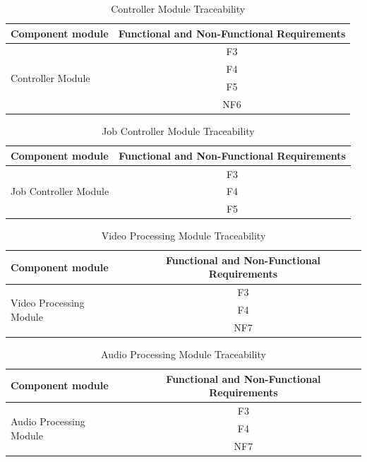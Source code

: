 \documentclass{article}
\begin{document}
\begin{table}[H]
    \caption{Controller Module Traceability}
    \centering
    \begin{tabular}{|l|c|} \hline
        \textbf{Component module} & \textbf{Functional and Non-Functional Requirements} \\ \hline
         \multirow{4}{*}{Controller Module} & F3 \\ \cline{2-2}
         & F4 \\ \cline{2-2}
         & F5 \\ \cline{2-2}
         & NF6 \\ \hline
    \end{tabular}
    \label{tab:Controller_Traceability}
\end{table}

\begin{table}[H]
    \caption{Job Controller Module Traceability}
    \centering
    \begin{tabular}{|l|c|} \hline
        \textbf{Component module} & \textbf{Functional and Non-Functional Requirements} \\ \hline
         \multirow{3}{*}{Job Controller Module} & F3 \\ \cline{2-2}
         & F4 \\ \cline{2-2}
         & F5 \\ \hline
    \end{tabular}
    \label{tab:Job_Controller_Traceability}
\end{table}

\begin{table}[H]
    \caption{Video Processing Module Traceability}
    \centering
    \begin{tabular}{|l|c|} \hline
        \textbf{Component module} & \textbf{Functional and Non-Functional Requirements} \\ \hline
         \multirow{3}{*}{Video Processing Module } & F3 \\ \cline{2-2}
         & F4 \\ \cline{2-2}
         & NF7 \\ \hline
    \end{tabular}
    \label{tab:Video_Processing_Module}
\end{table}

\begin{table}[H]
    \caption{Audio Processing Module Traceability}
    \centering
    \begin{tabular}{|l|c|} \hline
        \textbf{Component module} & \textbf{Functional and Non-Functional Requirements} \\ \hline
         \multirow{3}{*}{Audio Processing Module } & F3 \\ \cline{2-2}
         & F4 \\ \cline{2-2}
         & NF7 \\ \hline
    \end{tabular}
    \label{tab:Audio_Processing_Module}
\end{table}
\end{document}
